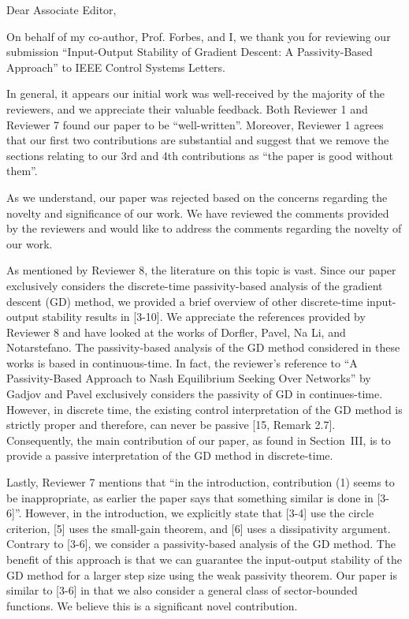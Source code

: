 \thispagestyle{empty}
\setcounter{page}{0}
\begin{flushleft}
    Dear Associate Editor,

    On behalf of my co-author, Prof. Forbes, and I, we thank you for reviewing our submission ``Input-Output Stability of Gradient Descent: A Passivity-Based Approach'' to IEEE Control Systems Letters.

    In general, it appears our initial work was well-received by the majority of the reviewers, and we appreciate their valuable feedback. Both Reviewer 1 and Reviewer 7 found our paper to be ``well-written''. Moreover, Reviewer 1 agrees that our first two contributions are substantial and suggest that we remove the sections relating to our 3rd and 4th contributions as ``the paper is good without them''.
    
    As we understand, our paper was rejected based on the concerns regarding the novelty and significance of our work. We have reviewed the comments provided by the reviewers and would like to address the comments regarding the novelty of our work.

    As mentioned by Reviewer 8, the literature on this topic is vast. Since our paper exclusively considers the discrete-time passivity-based analysis of the gradient descent (GD) method, we provided a brief overview of other discrete-time input-output stability results in [3-10]. We appreciate the references provided by Reviewer 8 and have looked at the works of Dorfler, Pavel, Na Li, and Notarstefano. The passivity-based analysis of the GD method considered in these works is based in continuous-time. In fact, the reviewer's reference to ``A Passivity-Based Approach to Nash Equilibrium Seeking Over Networks'' by Gadjov and Pavel exclusively considers the passivity of GD in continues-time. However, in discrete time, the existing control interpretation of the GD method is strictly proper and therefore, can never be passive [15, Remark 2.7]. Consequently, the main contribution of our paper, as found in Section~III, is to provide a passive interpretation of the GD method in discrete-time.

    Lastly, Reviewer 7 mentions that ``in the introduction, contribution (1) seems to be inappropriate, as earlier the paper says that something similar is done in [3-6]''. However, in the introduction, we explicitly state that [3-4] use the circle criterion, [5] uses the small-gain theorem, and [6] uses a dissipativity argument. Contrary to [3-6], we consider a passivity-based analysis of the GD method. The benefit of this approach is that we can guarantee the input-output stability of the GD method for a larger step size using the weak passivity theorem. Our paper is similar to [3-6] in that we also consider a general class of sector-bounded functions. We believe this is a significant novel contribution.


\end{flushleft}
